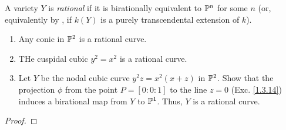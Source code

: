 \label{1.4.4}

A variety $Y$ is \emph{rational} if it is birationally equivalent to $\P^n$ for some $n$ (or, equivalently by \cite[I.4.5]{hartshorne}, if $k(Y)$ is a purely transcendental extension of $k$).

\begin{enumerate}[label = (\alph*)]
    \item Any conic in $\P^2$ is a rational curve.

    \item THe cuspidal cubic $y^2 = x^2$ is a rational curve.

    \item Let $Y$ be the nodal cubic curve $y^2 z = x^2 (x + z)$ in $\P^2$. Show that the projection $\phi$ from the point $P = [0 : 0 : 1]$ to the line $z = 0$ (Exc. \ref{1.3.14}) induces a birational map from $Y$ to $\P^1$. Thus, $Y$ is a rational curve.
\end{enumerate}

\begin{proof}

\end{proof}
